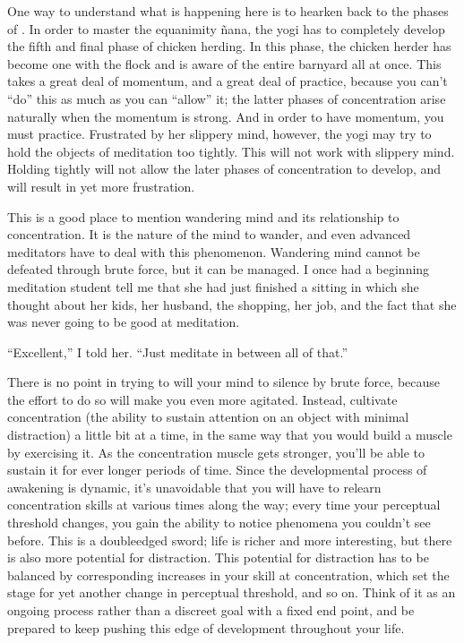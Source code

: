 \documentclass[a5paper,10pt,english]{book}
\begin{document}
\sphinxAtStartPar
One way to understand what is happening here is to hearken back to the
phases of {\hyperref[\detokenize{back-jhana-nana:chicken-herding}]{}}. In order to master the
equanimity ñana, the yogi has to completely develop the fifth and final
phase of chicken herding. In this phase, the chicken herder has become
one with the flock and is aware of the entire barnyard all at once. This
takes a great deal of momentum, and a great deal of practice, because
you can’t “do” this as much as you can “allow” it; the latter phases of
concentration arise naturally when the momentum is strong. And in order
to have momentum, you must practice. Frustrated by her slippery mind,
however, the yogi may try to hold the objects of meditation too tightly.
This will not work with slippery mind. Holding tightly will not allow
the later phases of concentration to develop, and will result in yet
more frustration.

\sphinxAtStartPar
This is a good place to mention wandering mind and its relationship to
concentration. It is the nature of the mind to wander, and even advanced
meditators have to deal with this phenomenon. Wandering mind cannot be
defeated through brute force, but it can be managed. I once had a
beginning meditation student tell me that she had just finished a
sitting in which she thought about her kids, her husband, the shopping,
her job, and the fact that she was never going to be good at meditation.

\sphinxAtStartPar
“Excellent,” I told her. “Just meditate in between all of that.”

\sphinxAtStartPar
There is no point in trying to will your mind to silence by brute force,
because the effort to do so will make you even more agitated. Instead,
cultivate concentration (the ability to sustain attention on an object
with minimal distraction) a little bit at a time, in the same way that
you would build a muscle by exercising it. As the concentration muscle
gets stronger, you’ll be able to sustain it for ever longer periods of
time. Since the developmental process of awakening is dynamic, it’s
unavoidable that you will have to relearn concentration skills at
various times along the way; every time your perceptual threshold
changes, you gain the ability to notice phenomena you couldn’t see
before. This is a double\sphinxhyphen{}edged sword; life is richer and more
interesting, but there is also more potential for distraction. This
potential for distraction has to be balanced by corresponding increases
in your skill at concentration, which set the stage for yet another
change in perceptual threshold, and so on. Think of it as an ongoing
process rather than a discreet goal with a fixed end point, and be
prepared to keep pushing this edge of development throughout your life.
\end{document}
